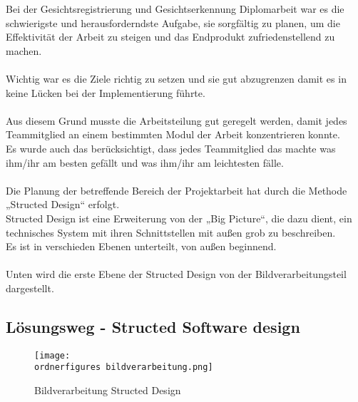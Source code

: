 Bei der Gesichtsregistrierung und Gesichtserkennung Diplomarbeit war es die schwierigste und herausforderndste Aufgabe, sie sorgfältig zu planen, um die Effektivität der Arbeit zu steigen und das Endprodukt zufriedenstellend zu machen. \\
 \\
Wichtig war es die Ziele richtig zu setzen und sie gut abzugrenzen damit es in keine Lücken bei der Implementierung führte. \\\\
Aus diesem Grund musste die Arbeitsteilung gut geregelt werden, damit jedes Teammitglied an einem bestimmten Modul der Arbeit konzentrieren konnte.\\
Es wurde auch das berücksichtigt, dass jedes Teammitglied das machte was ihm/ihr am besten gefällt und was ihm/ihr am leichtesten fälle. \\ \\
Die Planung der betreffende Bereich der Projektarbeit hat durch die Methode „Structed Design“ erfolgt. \\
Structed Design ist eine Erweiterung von der „Big Picture“, die dazu dient, ein technisches System mit ihren Schnittstellen mit außen grob zu beschreiben. \\
Es ist in verschieden Ebenen unterteilt, von außen beginnend. \\ \\
Unten wird die erste Ebene der Structed Design von der Bildverarbeitungsteil dargestellt. \\

\subsection{Lösungsweg - Structed Software design} 
  

\begin{figure}[H]
	\texttt{[image: \\ordnerfigures bildverarbeitung.png]}
	\caption{Bildverarbeitung Structed Design}
	\label{fig:bildverarbeitung}

\end{figure}

